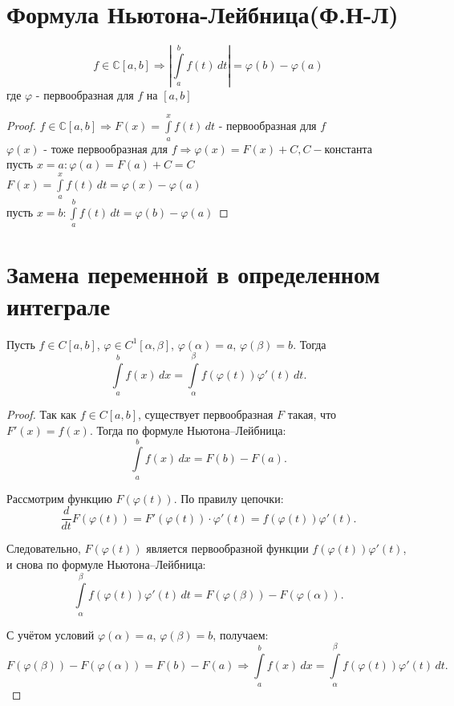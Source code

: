 \section{Формула Ньютона-Лейбница(Ф.Н-Л)}
\begin{theorem}
    \[
    f \in \mathbb{C}[a,b] \Rightarrow \left| \int\limits_{a}^{b} f(t) \, dt \right| = \varphi(b) - \varphi(a)
    \]
    где $\varphi$ - первообразная для $f$ на $[a,b]$ 
    
    \begin{proof}
        $ f \in \mathbb{C}[a,b] \Rightarrow F(x) = \int\limits_{a}^{x} f(t) \, dt $ - первообразная для $f$ \\
        $ \varphi(x)$ - тоже первообразная для $f \Rightarrow \varphi(x) = F(x)+C, C - \text{константа} $ \\
        пусть $ x = a: \varphi(a) = F(a) + C = C $ \\
        $ F(x) = \int\limits_{a}^{x} f(t) \, dt = \varphi(x) - \varphi(a) $ \\
        пусть $ x = b: \int\limits_{a}^{b} f(t) \, dt = \varphi(b) - \varphi(a) $
    \end{proof} 
\end{theorem}

\section{Замена переменной в определенном интеграле}

\begin{lemma}
    Пусть $f \in C[a,b]$, $\varphi \in C^1[\alpha,\beta]$, 
    $\varphi(\alpha)=a$, $\varphi(\beta)=b$. Тогда
    \[
    \int\limits_a^b f(x)\,dx = \int\limits_{\alpha}^{\beta} f(\varphi(t)) \varphi'(t)\,dt.
    \]

    \begin{proof}
        Так как $f \in C[a,b]$, существует первообразная $F$ такая, что $F'(x)=f(x)$. Тогда по формуле Ньютона--Лейбница:
        \[
        \int\limits_a^b f(x)\,dx = F(b)-F(a).
        \]

        Рассмотрим функцию $F(\varphi(t))$. По правилу цепочки:
        \[
        \frac{d}{dt} F(\varphi(t)) = F'(\varphi(t)) \cdot \varphi'(t) = f(\varphi(t)) \varphi'(t).
        \]

        Следовательно, $F(\varphi(t))$ является первообразной функции 
        $f(\varphi(t))\varphi'(t)$, и снова по формуле Ньютона--Лейбница:
        \[
        \int\limits_{\alpha}^{\beta} f(\varphi(t)) \varphi'(t)\,dt
        = F(\varphi(\beta)) - F(\varphi(\alpha)).
        \]

        С учётом условий $\varphi(\alpha)=a$, $\varphi(\beta)=b$, получаем:
        \[
        F(\varphi(\beta)) - F(\varphi(\alpha)) = F(b)-F(a) \Rightarrow
        \int\limits_a^b f(x)\,dx = \int\limits_{\alpha}^{\beta} f(\varphi(t)) \varphi'(t)\,dt.
        \]
    \end{proof}

\end{lemma}

